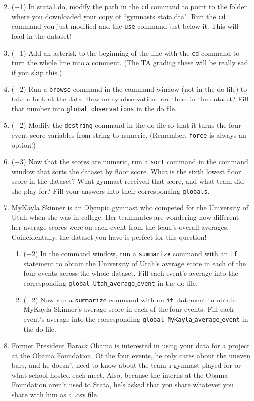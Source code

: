 \documentclass[12pt, oneside]{article}
\begin{document}
\begin{enumerate}
\setcounter{enumi}{1}
\item	(+1)	In stata1.do, modify the path in the \texttt{cd} command to point to the folder where you downloaded your copy of ``gymnasts$\_$stata.dta". Run the \texttt{cd} command you just modified and the \texttt{use} command just below it. This will load in the dataset! 
\item   (+1)    Add an asterisk to the beginning of the line with the \texttt{cd} command to turn the whole line into a comment. (The TA grading these will be really sad if you skip this.)
\item   (+2)    Run a \texttt{browse} command in the command window (not in the do file) to take a look at the data. How many observations are there in the dataset? Fill that number into \texttt{global observations} in the do file.
\item   (+2)    Modify the \texttt{destring} command in the do file so that it turns the four event score variables from string to numeric. (Remember, \texttt{force} is always an option!)
\item   (+3)    Now that the scores are numeric, run a \texttt{sort} command in the command window that sorts the dataset by floor score. What is the sixth lowest floor score in the dataset? What gymnast received that score, and what team did she play for? Fill your answers into their corresponding \texttt{globals}.
\item   MyKayla Skinner is an Olympic gymnast who competed for the University of Utah when she was in college. Her teammates are wondering how different her average scores were on each event from the team's overall averages. Coincidentally, the dataset you have is perfect for this question!
\begin{enumerate}
    \item (+2) In the command window, run a \texttt{summarize} command with an \texttt{if} statement to obtain the University of Utah's average score in each of the four events across the whole dataset. Fill each event's average into the corresponding \texttt{global Utah$\_$average$\_$event} in the do file.
    \item (+2) Now run a \texttt{summarize} command with an \texttt{if} statement to obtain MyKayla Skinner's average score in each of the four events. Fill each event's average into the corresponding \texttt{global MyKayla$\_$average$\_$event} in the do file.
\end{enumerate}
\item    Former President Barack Obama is interested in using your data for a project at the Obama Foundation. Of the four events, he only cares about the uneven bars, and he doesn't need to know about the team a gymnast played for or what school hosted each meet. Also, because the interns at the Obama Foundation aren't used to Stata, he's asked that you share whatever you share with him as a .csv file.

\end{enumerate}
\end{document}
